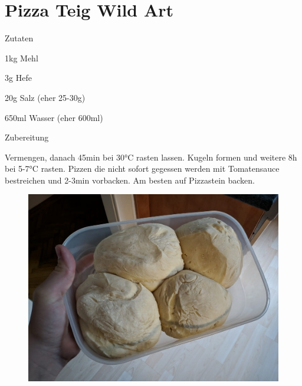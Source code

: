 \chapter*{Pizza Teig Wild Art}
\begin{multicols}{2}
 {\Large Zutaten}
 \begin{Zutaten}
		\item 1kg Mehl
		\item 3g Hefe
		\item 20g Salz \left(eher 25-30g\right) 
		\item 650ml Wasser \left(eher 600ml\right) 
		
		
		
		
\end{Zutaten}
\columnbreak
{}
\end{multicols}

{\Large Zubereitung} \newline
\begin{addmargin}[1cm]{0cm}
	Vermengen, danach 45min bei 30°C rasten lassen.\newline
	Kugeln formen und weitere 8h bei 5-7°C rasten.\newline
	Pizzen die nicht sofort gegessen werden mit Tomatensauce bestreichen und 2-3min vorbacken.\newline
	Am besten auf Pizzastein backen.
\end{addmargin}

\begin{figure}[H]
	\includegraphics[width=\textwidth*0.5]{figures/pizzaWild2.jpg}
\end{figure}